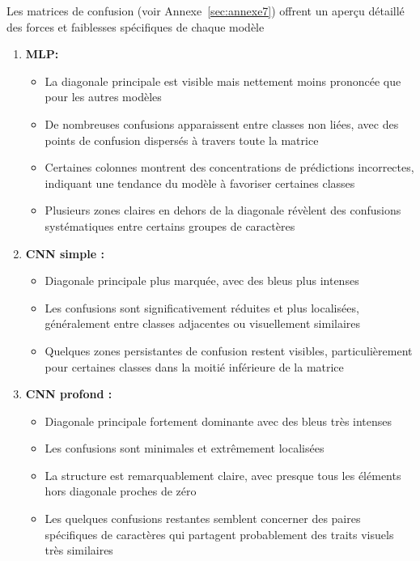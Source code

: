 \begin{flushleft}
Les matrices de confusion (voir Annexe~\ref{sec:annexe7}) offrent un aperçu détaillé des forces et faiblesses spécifiques de chaque modèle 

\begin{enumerate}
\item \textbf{MLP:}
\begin{itemize}
\item La diagonale principale est visible mais nettement moins prononcée que pour les autres modèles
\item De nombreuses confusions apparaissent entre classes non liées, avec des points de confusion dispersés à travers toute la matrice
\item Certaines colonnes montrent des concentrations de prédictions incorrectes, indiquant une tendance du modèle à favoriser certaines classes
\item Plusieurs zones claires en dehors de la diagonale révèlent des confusions systématiques entre certains groupes de caractères
\end{itemize}
\item \textbf{CNN simple :}
\begin{itemize}
\item Diagonale principale plus marquée, avec des bleus plus intenses
\item Les confusions sont significativement réduites et plus localisées, généralement entre classes adjacentes ou visuellement similaires
\item Quelques zones persistantes de confusion restent visibles, particulièrement pour certaines classes dans la moitié inférieure de la matrice
\end{itemize}
\item \textbf{CNN profond :}
\begin{itemize}
\item Diagonale principale fortement dominante avec des bleus très intenses
\item Les confusions sont minimales et extrêmement localisées
\item La structure est remarquablement claire, avec presque tous les éléments hors diagonale proches de zéro
\item Les quelques confusions restantes semblent concerner des paires spécifiques de caractères qui partagent probablement des traits visuels très similaires
\end{itemize}
\end{enumerate}


\end{flushleft}
